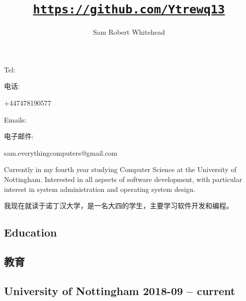 \documentclass[cv_en.tex]{subfiles}
\begin{document}
    \title{\href{https://github.com/Ytrewq13}{\texttt{https://github.com/Ytrewq13}}}
    \author{Sam Robert Whitehead}

    \maketitle

    \pagestyle{empty}
    \thispagestyle{empty}

\begin{xen}
    Tel:
\end{xen}
\begin{xcn}
    电话:
\end{xcn}
    +447478190577
    \hfill
\begin{xen}
    Emails:
\end{xen}
\begin{xcn}
    电子邮件:
\end{xcn}
    sam.everythingcomputers@gmail.com\\
    {}
    \vspace{1mm}
\begin{xen}
    Currently in my fourth year studying Computer Science at the University of
    Nottingham. Interested in all aspects of software development, with
    particular interest in system administration and operating system design.
\end{xen}
\begin{xcn}
    我现在就读于诺丁汉大学，是一名大四的学生，主要学习软件开发和编程。
\end{xcn}
\begin{xen}
    \section{Education}
\end{xen}
\begin{xcn}
    \section{教育}
\end{xcn}
\begin{xen}
    \subsection{University of Nottingham
        \hfill 2018-09 -- current}
\end{xen}
\end{document}
